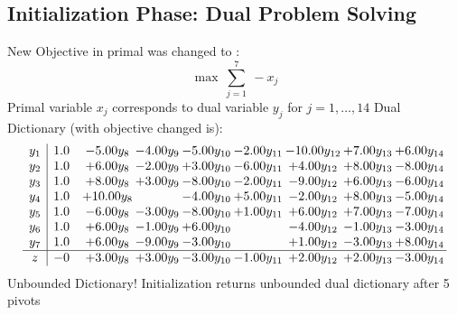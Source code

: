 \documentclass[9pt]{article}
\begin{document}
\subsection{Initialization Phase: Dual Problem Solving}
New Objective in primal was changed to : \[ \max\ \sum_{j=1}^{7}\ - x_j \] 
Primal variable $x_j$ corresponds to dual variable $y_j$ for $j = 1,\ldots,14$
Dual Dictionary (with objective changed is): 
\[\begin{array}{c| c c@{\hskip 2pt} c@{\hskip 2pt} c@{\hskip 2pt} c@{\hskip 2pt} c@{\hskip 2pt} c@{\hskip 2pt} c@{\hskip 2pt} }
 y_{1}   &  1.0 & -5.00 y_{8} & -4.00 y_{9} & -5.00 y_{10} & -2.00 y_{11} & -10.00 y_{12} & +  7.00 y_{13} & +  6.00 y_{14}\\
 y_{2}   &  1.0 & +  6.00 y_{8} & -2.00 y_{9} & +  3.00 y_{10} & -6.00 y_{11} & +  4.00 y_{12} & +  8.00 y_{13} & -8.00 y_{14}\\
 y_{3}   &  1.0 & +  8.00 y_{8} & +  3.00 y_{9} & -8.00 y_{10} & -2.00 y_{11} & -9.00 y_{12} & +  6.00 y_{13} & -6.00 y_{14}\\
 y_{4}   &  1.0 & + 10.00 y_{8} &   & -4.00 y_{10} & +  5.00 y_{11} & -2.00 y_{12} & +  8.00 y_{13} & -5.00 y_{14}\\
 y_{5}   &  1.0 & -6.00 y_{8} & -3.00 y_{9} & -8.00 y_{10} & +  1.00 y_{11} & +  6.00 y_{12} & +  7.00 y_{13} & -7.00 y_{14}\\
 y_{6}   &  1.0 & +  6.00 y_{8} & -1.00 y_{9} & +  6.00 y_{10} &   & -4.00 y_{12} & -1.00 y_{13} & -3.00 y_{14}\\
 y_{7}   &  1.0 & +  6.00 y_{8} & -9.00 y_{9} & -3.00 y_{10} &   & +  1.00 y_{12} & -3.00 y_{13} & +  8.00 y_{14}\\
\hline
z    &  -0 & +  3.00 y_{8} & +  3.00 y_{9} & -3.00 y_{10} & -1.00 y_{11} & +  2.00 y_{12} & +  2.00 y_{13} & -3.00 y_{14}\\
\end{array}\]
Unbounded Dictionary!
Initialization returns unbounded dual dictionary after 5 pivots
\end{document}
